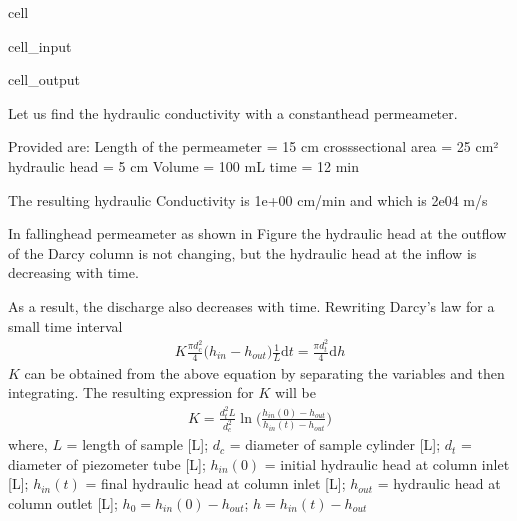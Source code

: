\documentclass[letterpaper,10pt,english]{jupyterBook}
\let\sphinxpxdimen\pdfpxdimen\else\newdimen\sphinxpxdimen
\begin{document}
\begin{sphinxuseclass}{cell}
\begin{sphinxVerbatimInput}
\begin{sphinxuseclass}{cell_input}
\end{sphinxuseclass}\end{sphinxVerbatimInput}
\begin{sphinxVerbatimOutput}

\begin{sphinxuseclass}{cell_output}
\begin{sphinxVerbatim}[commandchars=\\\{\}]
Let us find the hydraulic conductivity with a constant\PYGZhy{}head permeameter.

Provided are:
Length of the permeameter = 15 cm 
cross\PYGZhy{}sectional area = 25 cm²
hydraulic head = 5 cm 
Volume = 100 mL 
time = 12 min 

The resulting hydraulic Conductivity is 1e+00 cm/min 
and which is 2e\PYGZhy{}04 m/s
\end{sphinxVerbatim}

\end{sphinxuseclass}\end{sphinxVerbatimOutput}

\end{sphinxuseclass}
\sphinxAtStartPar
In falling\sphinxhyphen{}head permeameter as shown in Figure the hydraulic head at the outflow of
the Darcy column is not changing, but the hydraulic head at the inflow is decreasing
with time.

\noindent{\hspace*{\fill}\sphinxincludegraphics[height=255\sphinxpxdimen]{{L4_f6}.png}\hspace*{\fill}}

\sphinxAtStartPar
As a result, the discharge also decreases with time. Rewriting Darcy’s law for a small time interval
\begin{equation*}
\begin{split}
K \frac{\pi d_c^2}{4}\big(h_{in} - h_{out}\big)\frac{1}{L}\text{d}t = \frac{\pi d_t^2}{4}\text{d}h 
\end{split}
\end{equation*}
\sphinxAtStartPar
\(K\) can be obtained from the above equation by separating the variables and then integrating. The resulting expression for \(K\) will be
\begin{equation*}
\begin{split}
K = \frac{d_t^2 L}{d_c^2}\ln \Bigg(\frac{h_{in}(0) - h_{out}}{h_{in}(t)-h_{out}}\Bigg)
\end{split}
\end{equation*}
\sphinxAtStartPar
where, 
\(L\) = length of sample {[}L{]};
\(d_c\) = diameter of sample cylinder {[}L{]};
\(d_t\) = diameter of piezometer tube {[}L{]}; 
\(h_{in}(0)\) = initial hydraulic head at column inlet {[}L{]}; 
\(h_{in}(t)\) = final hydraulic head at column inlet {[}L{]}; 
\(h_{out}\) = hydraulic head at column outlet {[}L{]}; 
\(h_0 = h_{in}(0) - h_{out}\); 
\(h = h_{in}(t) - h_{out}\)
\end{document}
